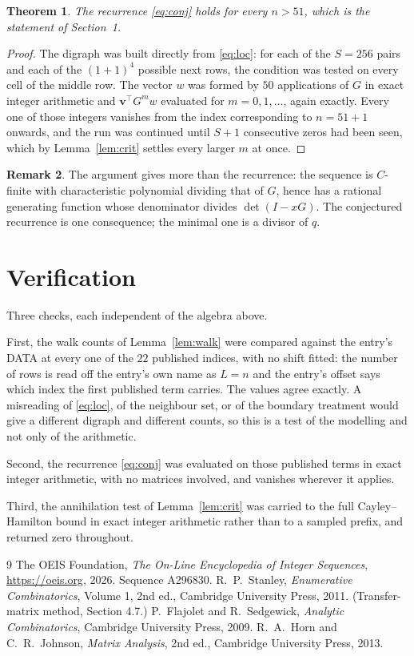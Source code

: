\documentclass[11pt,a4paper]{article}
\theoremstyle{plain}
\newtheorem{theorem}{Theorem}
\theoremstyle{definition}
\newtheorem{remark}[theorem]{Remark}
\begin{document}
\begin{theorem}
The recurrence \eqref{eq:conj} holds for every $n>51$, which is the statement of
Section~1.
\end{theorem}

\begin{proof}
The digraph was built directly from \eqref{eq:loc}: for each of the $S=256$ pairs and each
of the $(1+1)^{4}$ possible next rows, the condition was tested on every cell of
the middle row. The vector $w$ was formed by $50$ applications of $G$ in exact integer
arithmetic and $\mathbf{v}^{\!\top}G^{m}w$ evaluated for $m=0,1,\dots$, again exactly.
Every one of those integers vanishes from the index corresponding to $n=51+1$ onwards,
and the run was continued until $S+1$ consecutive zeros had been seen, which by
Lemma~\ref{lem:crit} settles every larger $m$ at once.
\end{proof}

\begin{remark}
The argument gives more than the recurrence: the sequence is $C$-finite with characteristic
polynomial dividing that of $G$, hence has a rational generating function whose denominator
divides $\det(I-xG)$. The conjectured recurrence is one consequence; the minimal one is a
divisor of $q$.
\end{remark}

\section{Verification}

Three checks, each independent of the algebra above.

First, the walk counts of Lemma~\ref{lem:walk} were compared against the entry's DATA at
every one of the $22$ published indices, with no shift fitted: the number of rows is
read off the entry's own name as $L=n$ and the entry's offset says which index the first
published term carries. The values agree exactly. A misreading of \eqref{eq:loc}, of the
neighbour set, or of the boundary treatment would give a different digraph and different
counts, so this is a test of the modelling and not only of the arithmetic.

Second, the recurrence \eqref{eq:conj} was evaluated on those published terms in exact
integer arithmetic, with no matrices involved, and vanishes wherever it applies.

Third, the annihilation test of Lemma~\ref{lem:crit} was carried to the full
Cayley--Hamilton bound in exact integer arithmetic rather than to a sampled prefix, and
returned zero throughout.

\begin{thebibliography}{9}
 The OEIS Foundation, \emph{The On-Line Encyclopedia of Integer
Sequences}, \url{https://oeis.org}, 2026. Sequence A296830.
 R.~P.~Stanley, \emph{Enumerative Combinatorics}, Volume 1, 2nd ed.,
Cambridge University Press, 2011. (Transfer-matrix method, Section 4.7.)
 P.~Flajolet and R.~Sedgewick, \emph{Analytic Combinatorics}, Cambridge
University Press, 2009.
 R.~A.~Horn and C.~R.~Johnson, \emph{Matrix Analysis}, 2nd ed., Cambridge
University Press, 2013.
\end{thebibliography}
\end{document}

